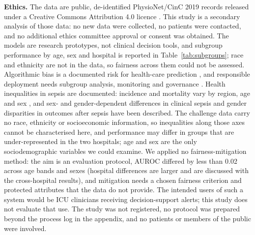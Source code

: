 \documentclass[preprint,12pt]{elsarticle}
\begin{document}
\textbf{Ethics.} The data are public, de-identified PhysioNet/CinC 2019 records released under a Creative Commons Attribution 4.0 licence \cite{reyna2020,goldberger2000}. This study is a secondary analysis of those data: no new data were collected, no patients were contacted, and no additional ethics committee approval or consent was obtained. The models are research prototypes, not clinical decision tools, and subgroup performance by age, sex and hospital is reported in Table~\ref{tab:subgroups}; race and ethnicity are not in the data, so fairness across them could not be assessed. Algorithmic bias is a documented risk for health-care prediction \cite{obermeyer2019}, and responsible deployment needs subgroup analysis, monitoring and governance \cite{wiens2019}. Health inequalities in sepsis are documented: incidence and mortality vary by region, age and sex \cite{rudd2020}, and sex- and gender-dependent differences in clinical sepsis \cite{zhang2021} and gender disparities in outcomes after sepsis \cite{wilcox2020} have been described. The challenge data carry no race, ethnicity or socioeconomic information, so inequalities along those axes cannot be characterised here, and performance may differ in groups that are under-represented in the two hospitals; age and sex are the only sociodemographic variables we could examine. We applied no fairness-mitigation method: the aim is an evaluation protocol, AUROC differed by less than 0.02 across age bands and sexes (hospital differences are larger and are discussed with the cross-hospital results), and mitigation needs a chosen fairness criterion and protected attributes that the data do not provide. The intended users of such a system would be ICU clinicians receiving decision-support alerts; this study does not evaluate that use. The study was not registered, no protocol was prepared beyond the process log in the appendix, and no patients or members of the public were involved.
\end{document}
